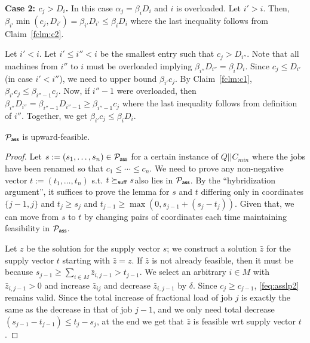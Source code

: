 \noindent
{\bf Case 2: $c_j > D_i$.} In this case $\alpha_j = \beta_iD_i$ and $i$ is overloaded. Let $i' > i$. Then, $\beta_{i'}\min(c_j,D_{i'}) = \beta_{i'}D_{i'} \leq \beta_iD_i$ where the last inequality follows from Claim~\ref{fclm:c2}.


Let $i' < i$. Let $i'\leq i'' < i$ be the smallest entry such that $c_j > D_{i''}$. Note that all machines from $i''$ to $i$ must be overloaded implying $\beta_{i''}D_{i''} = \beta_iD_i$.
Since $c_j \leq D_{i'}$ (in case $i' < i''$), we need to upper bound $\beta_{i'}c_j$.
By Claim~\ref{fclm:c1}, $\beta_{i'}c_j \leq \beta_{i''-1}c_j$. Now, if $i''-1$ were overloaded,
then $\beta_{i''}D_{i''} = \beta_{i''-1}D_{i''-1} \geq \beta_{i''-1}c_j$ where the last inequality follows from definition of $i''$. Together, we get $\beta_{i'}c_j \leq \beta_iD_i$.
\def\y{\bar{y}}
\def\z{\bar{z}}
\def\yy{\bar{\bar{y}}}
\begin{lemma}\label{flem:conf-is-uf}
	${\cal P}_\mathsf{ass}$ is upward-feasible.
\end{lemma}
\begin{proof}
	Let $s := (s_1,\ldots,s_n)\in {\cal P}_\mathsf{ass}$ for a certain instance of $Q||C_{min}$ where the jobs have been renamed so that $c_1\leq \cdots \leq c_n$. We need to prove any non-negative vector $t := (t_1,\ldots,t_n)$ s.t. $t\succeq_{\mathsf{suff}} s$also lies in ${\cal P}_\mathsf{ass}$.
	By the ``hybridization argument'', it suffices to prove the lemma for  $s$ and $t$ differing only in coordinates $\{j-1,j\}$ and $ t_j\ge s_j$ and $t_{j-1} \geq \max(0,s_{j-1} + (s_j - t_j))$.
	Given that, we can move from $s$ to $t$ by changing pairs of coordinates each time maintaining feasibility in ${\cal P}_\mathsf{ass}$.
	
	Let $z$ be the solution for the supply vector $s$; we construct a solution $\z$  for the supply vector $t$ starting with $\z = z$.
	If $\z$ is not already feasible, then it must be because $s_{j-1} \geq \sum_{i\in M} \z_{i,j-1} > t_{j-1}$.
	We select an arbitrary $i\in M$ with $\z_{i,j-1} > 0$ and increase $\z_{ij}$ and decrease $\z_{i,j-1}$ by $\delta$. Since $c_j \geq c_{j-1}$, \eqref{feq:asslp2} remains valid.
	Since the total increase of fractional load of job $j$ is exactly the same as the decrease in that of job $j-1$, and we only need total  decrease $(s_{j-1} -t_{j-1}) \leq t_j - s_j$, at the end we get that $\z$ is feasible wrt supply vector $t$.
	
\end{proof}
